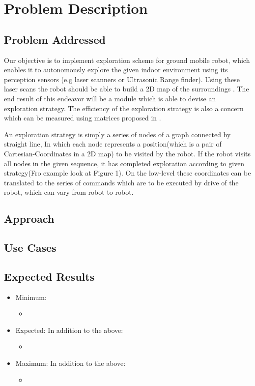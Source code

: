 \section{Problem Description}

\subsection{Problem Addressed}
Our objective is to implement exploration scheme for ground mobile robot, which enables it to autonomously explore the given indoor environment using its perception sensors (e.g laser scanners or Ultrasonic Range finder). Using these laser scans the robot should be able to build a 2D map of the surroundings . The end result of this endeavor will be a module which is able to devise an exploration strategy. The efficiency of the exploration strategy is also a concern which can be measured using matrices proposed in \cite{Juliae2012}. \par
An exploration strategy is simply a series of nodes of a graph connected by straight line, In which each node represents a position(which is a pair of Cartesian-Coordinates in a 2D map) to be visited by the robot. If the robot visits all nodes in the given sequence, it has completed exploration according to given strategy(Fro example look at Figure 1). On the low-level these coordinates can be translated to the series of commands which are to be executed by drive of the robot, which can vary from robot to robot.\par


\subsection{Approach}


\subsection{Use Cases}

\subsection{Expected Results}
\begin{itemize}
	\item Minimum:
	\begin{itemize}
		\item
	\end{itemize}
	\item Expected:
	In addition to the above:
	\begin{itemize}
		\item 
	\end{itemize}
	\item Maximum:
	In addition to the above:
	\begin{itemize}
		\item 
	\end{itemize}
\end{itemize}
